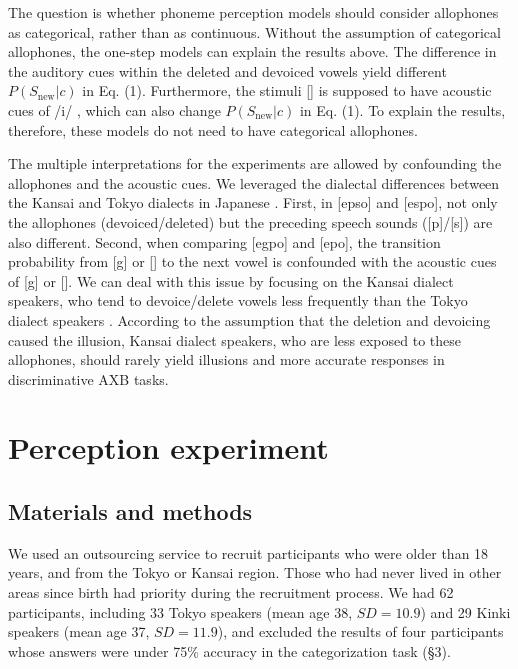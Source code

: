 \documentclass[a4paper,11pt,twocolumn]{article}
\begin{document}
The question is whether phoneme perception models should consider allophones as categorical, rather than as continuous. Without the assumption of categorical allophones, the one-step models can explain the results above. The difference in the auditory cues within the deleted and devoiced vowels yield different $P(S_{\text{new}}|c)$ in Eq. (1). Furthermore, the stimuli [\textctc] is supposed to have acoustic cues of /i/ \cite{kubozono1999japanese_eng}, which can also change $P(S_{\text{new}}|c)$ in Eq. (1). To explain the results, therefore, these models do not need to have categorical allophones.

The multiple interpretations for the experiments are allowed by confounding the allophones and the acoustic cues. We leveraged the dialectal differences between the Kansai and Tokyo dialects in Japanese \cite{kishiyama2022onestep}. First, in [ep\textsubring{\textturnm}so] and [espo], not only the allophones (devoiced/deleted) but the preceding speech sounds ([p]/[s]) are also different. Second, when comparing [egpo] and [e\textctc{}po], the transition probability from [g] or [\textctc] to the next vowel is confounded with the acoustic cues of [g] or [\textctc]. We can deal with this issue by focusing on the Kansai dialect speakers, who tend to devoice/delete vowels less frequently than the Tokyo dialect speakers \cite{byun2011_eng, byun2012_eng}. According to the assumption that the deletion and devoicing caused the illusion, Kansai dialect speakers, who are less exposed to these allophones, should rarely yield illusions and more accurate responses in discriminative AXB tasks.

\section{Perception experiment}

\subsection{Materials and methods}

We used an outsourcing service to recruit participants who were older than 18 years, and from the Tokyo or Kansai region. Those who had never lived in other areas since birth had priority during the recruitment process. We had 62 participants, including 33 Tokyo speakers (mean age 38, $SD = 10.9$) and 29 Kinki speakers (mean age 37, $SD = 11.9$), and excluded the results of four participants whose answers were under 75\% accuracy in the categorization task (\S3).
\end{document}
